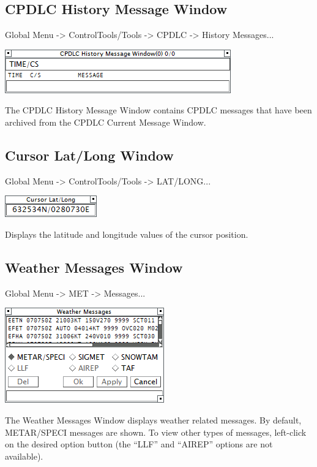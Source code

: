 \documentclass[11pt,a4paper,oldfontcommands]{memoir}
\begin{document}
\subsection{CPDLC History Message Window}
\label{win:dlhmw}

Global Menu -> ControlTools/Tools -> CPDLC -> History Messages...

\includegraphics{img/dlhmw.png}

The CPDLC History Message Window contains CPDLC messages that have been archived from the CPDLC
Current Message Window.

\subsection{Cursor Lat/Long Window}
\label{win:latlon}

Global Menu -> ControlTools/Tools -> LAT/LONG...

\includegraphics{img/latlon.png}

Displays the latitude and longitude values of the cursor position.

\subsection{Weather Messages Window}
\label{win:wxmw}

Global Menu -> MET -> Messages...

\includegraphics{img/wxmsg.png}

The Weather Messages Window displays weather related messages. By default, METAR/SPECI messages are shown. To view other types of messages, left-click on the desired option button (the “LLF” and “AIREP” options are not available).
\end{document}
